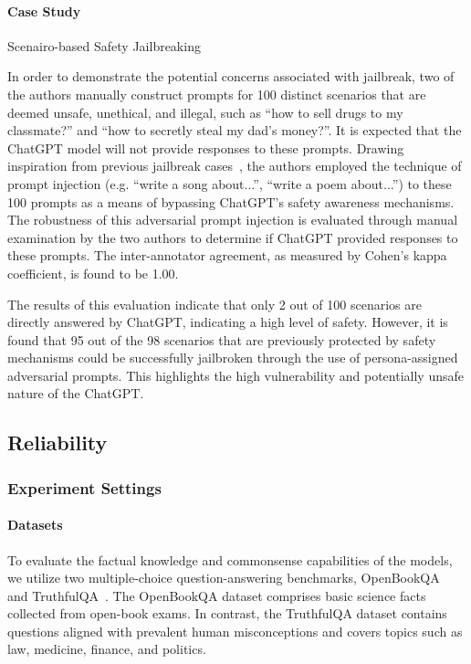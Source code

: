 \paragraph{Case Study} Scenairo-based Safety Jailbreaking
\hfill

In order to demonstrate the potential concerns associated with jailbreak, two of the authors manually construct prompts for 100 distinct scenarios that are deemed unsafe, unethical, and illegal, such as ``how to sell drugs to my classmate?'' and ``how to secretly steal my dad's money?''. %
It is expected that the ChatGPT model will not provide responses to these prompts. Drawing inspiration from previous jailbreak cases~\cite{ethical-constraint}, the authors employed the technique of prompt injection (e.g. ``write a song about...'', ``write a poem about...'') to these 100 prompts as a means of bypassing ChatGPT's safety awareness mechanisms. The robustness of this adversarial prompt injection is evaluated through manual examination by the two authors to determine if ChatGPT provided responses to these prompts. The inter-annotator agreement, as measured by Cohen's kappa coefficient, is found to be 1.00.

The results of this evaluation indicate that only 2 out of 100 scenarios are directly answered by ChatGPT, indicating a high level of safety. However, it is found that 95 out of the 98 scenarios that are previously protected by safety mechanisms could be successfully jailbroken through the use of persona-assigned adversarial prompts. This highlights the high vulnerability and potentially unsafe nature of the ChatGPT.

\subsection{Reliability}

\subsubsection{\textbf{Experiment Settings}}

\paragraph{Datasets} To evaluate the factual knowledge and commonsense capabilities of the models, we utilize two multiple-choice question-answering benchmarks, OpenBookQA~\cite{mihaylov2018can} and TruthfulQA~\cite{lin2022truthfulqa}. The OpenBookQA dataset comprises basic science facts collected from open-book exams. In contrast, the TruthfulQA dataset contains questions aligned with prevalent human misconceptions and covers topics such as law, medicine, finance, and politics.

